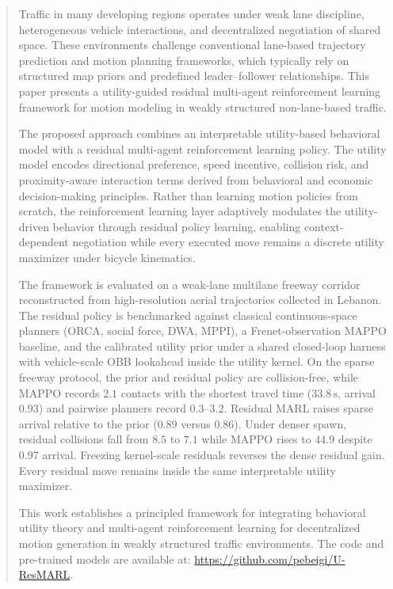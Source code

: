 \documentclass[conference]{IEEEtran}
\begin{document}
\begin{abstract}

Traffic in many developing regions operates under weak lane discipline, heterogeneous vehicle interactions, and decentralized negotiation of shared space. These environments challenge conventional lane-based trajectory prediction and motion planning frameworks, which typically rely on structured map priors and predefined leader--follower relationships. This paper presents a utility-guided residual multi-agent reinforcement learning framework for motion modeling in weakly structured non-lane-based traffic.

The proposed approach combines an interpretable utility-based behavioral model with a residual multi-agent reinforcement learning policy. The utility model encodes directional preference, speed incentive, collision risk, and proximity-aware interaction terms derived from behavioral and economic decision-making principles. Rather than learning motion policies from scratch, the reinforcement learning layer adaptively modulates the utility-driven behavior through residual policy learning, enabling context-dependent negotiation while every executed move remains a discrete utility maximizer under bicycle kinematics.

The framework is evaluated on a weak-lane multilane freeway corridor reconstructed from high-resolution aerial trajectories collected in Lebanon. The residual policy is benchmarked against classical continuous-space planners (ORCA, social force, DWA, MPPI), a Frenet-observation MAPPO baseline, and the calibrated utility prior under a shared closed-loop harness with vehicle-scale OBB lookahead inside the utility kernel. On the sparse freeway protocol, the prior and residual policy are collision-free, while MAPPO records $2.1$ contacts with the shortest travel time ($33.8\,\mathrm{s}$, arrival $0.93$) and pairwise planners record $0.3$--$3.2$. Residual MARL raises sparse arrival relative to the prior ($0.89$ versus $0.86$). Under denser spawn, residual collisions fall from $8.5$ to $7.1$ while MAPPO rises to $44.9$ despite $0.97$ arrival. Freezing kernel-scale residuals reverses the dense residual gain. Every residual move remains inside the same interpretable utility maximizer.

This work establishes a principled framework for integrating behavioral utility theory and multi-agent reinforcement learning for decentralized motion generation in weakly structured traffic environments. The code and pre-trained models are available at: \url{https://github.com/pebeigi/U-ResMARL}.

\end{abstract}
\end{document}
